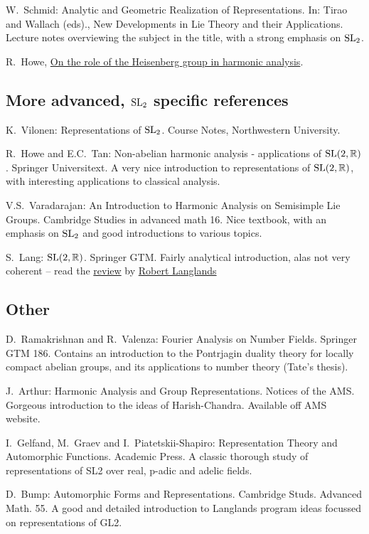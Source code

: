 {W.~Schmid: Analytic and Geometric Realization of Representations. In: Tirao and Wallach (eds)., New Developments in Lie Theory and their Applications. Lecture notes overviewing the subject in the title, with a strong emphasis on $\operatorname{SL}_2$.

R.~Howe, \href{https://utexas.instructure.com/courses/1428938/files/86306747?wrap=1}{On the role of the Heisenberg group in harmonic analysis}.
\subsection*{\hspace{1em}More advanced, $\operatorname{SL}_2$ specific references}
K.~Vilonen: Representations of $\operatorname{SL}_2$. Course Notes, Northwestern University.

R.~Howe and E.C.~Tan: Non-abelian harmonic analysis - applications of $\operatorname{SL}(2,\mathbb R)$. Springer Universitext. A very nice introduction to representations of $\operatorname{SL}(2,\mathbb R)$, with interesting applications to classical analysis.

V.S.~Varadarajan: An Introduction to Harmonic Analysis on Semisimple Lie Groups. Cambridge Studies in advanced math 16. Nice textbook, with an emphasis on $\operatorname{SL}_2$ and good introductions to various topics.

S.~Lang: $\operatorname{SL}(2,\mathbb R)$. Springer GTM. Fairly analytical introduction, alas not very coherent -- read the \href{http://www.sunsite.ubc.ca/DigitalMathArchive/Langlands/miscellaneous.html#lang}{review} by \href{http://www.sunsite.ubc.ca/DigitalMathArchive/Langlands}{Robert Langlands}
\subsection*{\hspace{1em}Other}
D.~Ramakrishnan and R.~Valenza: Fourier Analysis on Number Fields. Springer GTM 186. Contains an introduction to the Pontrjagin duality theory for locally compact abelian groups, and its applications to number theory (Tate's thesis).

J.~Arthur: Harmonic Analysis and Group Representations. Notices of the AMS. Gorgeous introduction to the ideas of Harish-Chandra. Available off AMS website.

I.~Gelfand, M.~Graev and I.~Piatetskii-Shapiro: Representation Theory and Automorphic Functions. Academic Press. A classic thorough study of representations of SL2 over real, p-adic and adelic fields.

D.~Bump: Automorphic Forms and Representations. Cambridge Studs. Advanced Math. 55. A good and detailed introduction to Langlands program ideas focussed on representations of GL2.

}
